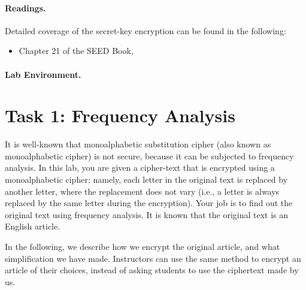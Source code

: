 \paragraph{Readings.}
Detailed coverage of the secret-key encryption can be found in the following:

\begin{itemize}
\item Chapter 21 of the SEED Book, \seedbook
\end{itemize}


\paragraph{Lab Environment.} \seedenvironmentB




\section{Task 1: Frequency Analysis}

It is well-known that monoalphabetic substitution cipher (also known as monoalphabetic cipher) 
is not secure, because it can be subjected to frequency analysis. In this lab, you are given 
a cipher-text that is encrypted using a monoalphabetic cipher; namely,
each letter in the original text is replaced by another letter, 
where the replacement does not vary (i.e., a letter is always replaced by the same letter
during the encryption). Your job is to find out the original text using 
frequency analysis. It is known that the original text is an English article. 


In the following, we describe how we encrypt the original article, and what 
simplification we have made. Instructors can use the same
method to encrypt an article of their choices, instead of asking 
students to use the ciphertext made by us.

